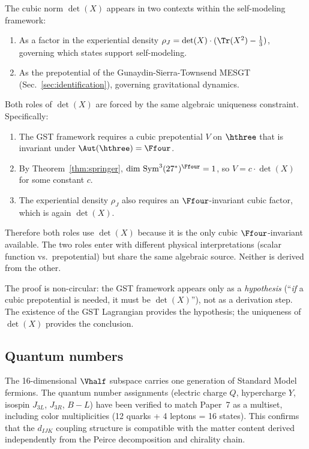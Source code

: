 The cubic norm $\det(X)$ appears in two contexts within the self-modeling
framework:
\begin{enumerate}
\item As a factor in the experiential density
  $\rho_J = \det(X) \cdot (\Tr(X^2) - \tfrac{1}{3})$, governing which
  states support self-modeling.

\item As the prepotential of the Gunaydin-Sierra-Townsend MESGT
  (Sec.~\ref{sec:identification}), governing gravitational dynamics.
\end{enumerate}

\begin{corollary}
\label{cor:double-duty}
Both roles of $\det(X)$ are forced by the same algebraic uniqueness
constraint. Specifically:
\begin{enumerate}[label=(\alph*)]
\item The GST framework requires a cubic prepotential $V$ on $\hthree$
  that is invariant under $\Aut(\hthree) = \Ffour$.
\item By Theorem~\ref{thm:springer}, $\dim\,\mathrm{Sym}^3(27^*)^{\Ffour}
  = 1$, so $V = c \cdot \det(X)$ for some constant $c$.
\item The experiential density $\rho_J$ also requires an
  $\Ffour$-invariant cubic factor, which is again $\det(X)$.
\end{enumerate}
Therefore both roles use $\det(X)$ because it is the only cubic
$\Ffour$-invariant available. The two roles enter with different physical
interpretations (scalar function vs.\ prepotential) but share the same
algebraic source. Neither is derived from the other.
\end{corollary}

The proof is non-circular: the GST framework appears only as a
\emph{hypothesis} (``\emph{if} a cubic prepotential is needed, it must
be $\det(X)$''), not as a derivation step. The existence of the GST
Lagrangian provides the hypothesis; the uniqueness of $\det(X)$ provides
the conclusion.

\subsection{Quantum numbers}

The 16-dimensional $\Vhalf$ subspace carries one generation of Standard
Model fermions. The quantum number assignments (electric charge $Q$,
hypercharge $Y$, isospin $J_{3L}$, $J_{3R}$, $B - L$) have been
verified to match Paper~7 as a multiset, including color multiplicities
(12 quarks + 4 leptons = 16 states). This confirms that the $d_{IJK}$
coupling structure is compatible with the matter content derived
independently from the Peirce decomposition and chirality chain.
